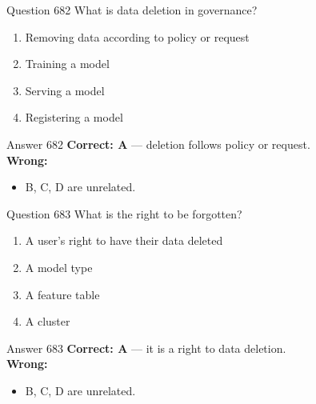 \documentclass[aspectratio=169,11pt]{beamer}
\begin{document}
	\begin{frame}{Question 682}
		What is data deletion in governance?
		\begin{enumerate}[label=\Alph*.]
			\item Removing data according to policy or request
			\item Training a model
			\item Serving a model
			\item Registering a model
		\end{enumerate}
	\end{frame}
	\begin{frame}{Answer 682}
		\textbf{Correct: A} --- deletion follows policy or request.\\
		\vspace{0.5em}
		\textbf{Wrong:}
		\begin{itemize}
			\item B, C, D are unrelated.
		\end{itemize}
	\end{frame}
	
	\begin{frame}{Question 683}
		What is the right to be forgotten?
		\begin{enumerate}[label=\Alph*.]
			\item A user's right to have their data deleted
			\item A model type
			\item A feature table
			\item A cluster
		\end{enumerate}
	\end{frame}
	\begin{frame}{Answer 683}
		\textbf{Correct: A} --- it is a right to data deletion.\\
		\vspace{0.5em}
		\textbf{Wrong:}
		\begin{itemize}
			\item B, C, D are unrelated.
		\end{itemize}
	\end{frame}
	
\end{document}
